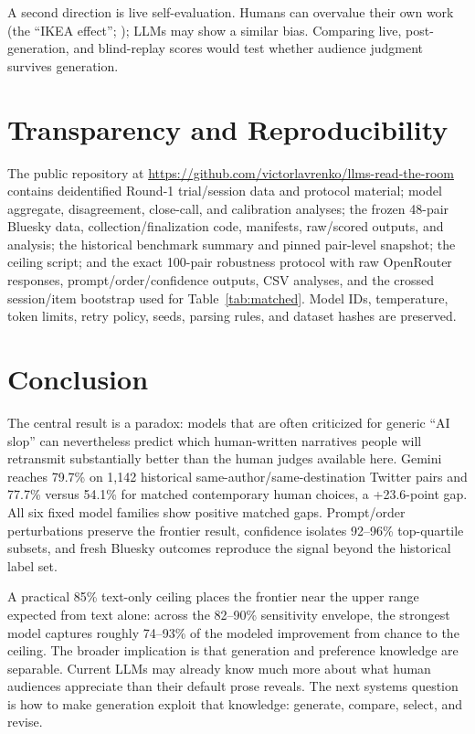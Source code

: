 \documentclass[10pt,twocolumn]{article}
\begin{document}
A second direction is live self-evaluation. Humans can overvalue their own work (the ``IKEA effect''; \citealp{norton2012}); LLMs may show a similar bias. Comparing live, post-generation, and blind-replay scores would test whether audience judgment survives generation.

\section{Transparency and Reproducibility}
The public repository at \url{https://github.com/victorlavrenko/llms-read-the-room} contains deidentified Round-1 trial/session data and protocol material; model aggregate, disagreement, close-call, and calibration analyses; the frozen 48-pair Bluesky data, collection/finalization code, manifests, raw/scored outputs, and analysis; the historical benchmark summary and pinned pair-level snapshot; the ceiling script; and the exact 100-pair robustness protocol with raw OpenRouter responses, prompt/order/confidence outputs, CSV analyses, and the crossed session/item bootstrap used for Table~\ref{tab:matched}. Model IDs, temperature, token limits, retry policy, seeds, parsing rules, and dataset hashes are preserved.

\section{Conclusion}
The central result is a paradox: models that are often criticized for generic ``AI slop'' can nevertheless predict which human-written narratives people will retransmit substantially better than the human judges available here. Gemini reaches 79.7\% on 1,142 historical same-author/same-destination Twitter pairs and 77.7\% versus 54.1\% for matched contemporary human choices, a +23.6-point gap. All six fixed model families show positive matched gaps. Prompt/order perturbations preserve the frontier result, confidence isolates 92--96\% top-quartile subsets, and fresh Bluesky outcomes reproduce the signal beyond the historical label set.

A practical 85\% text-only ceiling places the frontier near the upper range expected from text alone: across the 82--90\% sensitivity envelope, the strongest model captures roughly 74--93\% of the modeled improvement from chance to the ceiling. The broader implication is that generation and preference knowledge are separable. Current LLMs may already know much more about what human audiences appreciate than their default prose reveals. The next systems question is how to make generation exploit that knowledge: generate, compare, select, and revise.
\end{document}
